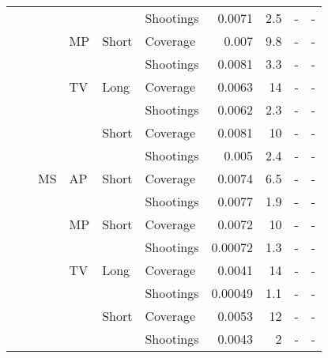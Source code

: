 \documentclass[article]{standalone}
\begin{document}
\begin{tabular}{llllllrrrr}
             &                   &    &    &       & Shootings &               0.0071 &       2.5 &                    - &                     - \\
             &                   &    & MP & Short & Coverage &                0.007 &       9.8 &                    - &                     - \\
             &                   &    &    &       & Shootings &               0.0081 &       3.3 &                    - &                     - \\
             &                   &    & TV & Long & Coverage &               0.0063 &        14 &                    - &                     - \\
             &                   &    &    &       & Shootings &               0.0062 &       2.3 &                    - &                     - \\
             &                   &    &    & Short & Coverage &               0.0081 &        10 &                    - &                     - \\
             &                   &    &    &       & Shootings &                0.005 &       2.4 &                    - &                     - \\
             &                   & MS & AP & Short & Coverage &               0.0074 &       6.5 &                    - &                     - \\
             &                   &    &    &       & Shootings &               0.0077 &       1.9 &                    - &                     - \\
             &                   &    & MP & Short & Coverage &               0.0072 &        10 &                    - &                     - \\
             &                   &    &    &       & Shootings &              0.00072 &       1.3 &                    - &                     - \\
             &                   &    & TV & Long & Coverage &               0.0041 &        14 &                    - &                     - \\
             &                   &    &    &       & Shootings &              0.00049 &       1.1 &                    - &                     - \\
             &                   &    &    & Short & Coverage &               0.0053 &        12 &                    - &                     - \\
             &                   &    &    &       & Shootings &               0.0043 &         2 &                    - &                     - \\
\bottomrule
\end{tabular}
\end{document}
